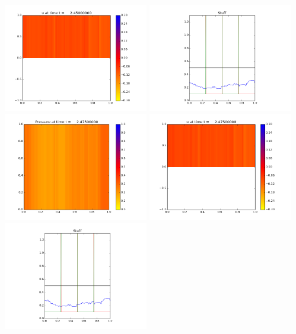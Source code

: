 \documentclass[11pt]{article}
\begin{document}
\includegraphics[width=0.475\textwidth]{frame0098fig1.png}
\vskip 10pt 
\includegraphics[width=0.475\textwidth]{frame0098fig3.png}
\vskip 10pt 
\includegraphics[width=0.475\textwidth]{frame0099fig0.png}
\includegraphics[width=0.475\textwidth]{frame0099fig1.png}
\vskip 10pt 
\includegraphics[width=0.475\textwidth]{frame0099fig3.png}
\end{document}
